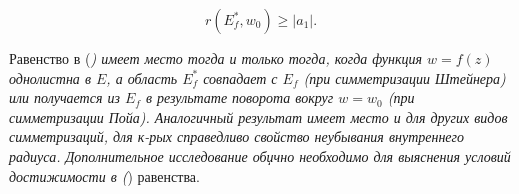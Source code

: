 \documentclass[10pt]{article}
\begin{document}
\[

r\left(E_{f}^{*}, w_{0}\right) \geqslant\left|a_{1}\right| .

\]



Равенство в (\textit{) имеет место тогда и только тогда, когда функция $w=f(z)$ однолистна в $E$, а область $E_{f}^{*}$ совпадает с $E_{f}$ (при симметризации Штейнера) или получается из $E_{f}$ в результате поворота вокруг $w=w_{0}$ (при симметризации Пойа). Аналогичный результат имеет место и для других видов симметризаций, для к-рых справедливо свойство неубывания внутреннего радиуса. Дополнительное исследование обџчно необходимо для выяснения условий достижимости в (}) равенства.
\end{document}

